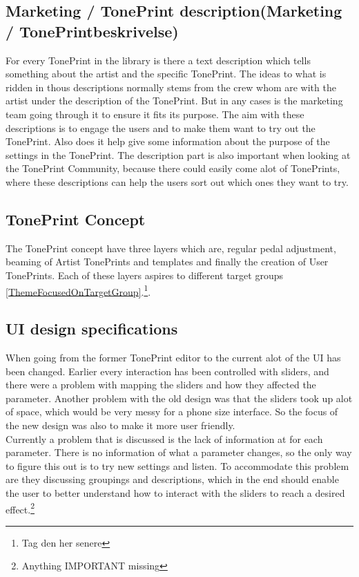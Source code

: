 \subsection*{Marketing / TonePrint description(Marketing / TonePrintbeskrivelse)} 
\label{ThemeMarketingTonePrintDescription}
For every TonePrint in the library is there a text description which tells something about the artist and the specific TonePrint. The ideas to what is ridden in thous descriptions normally stems from the crew whom are with the artist under the description of the TonePrint. But in any cases is the marketing team going through it to ensure it fits its purpose. The aim with these descriptions is to engage the users and to make them want to try out the TonePrint. Also does it help give some information about the purpose of the settings in the TonePrint. The description part is also important when looking at the TonePrint Community, because there could easily come alot of TonePrints, where these descriptions can help the users sort out which ones they want to try. 

\subsection*{TonePrint Concept}
\label{ThemeTonePrintConcept}
The TonePrint concept have three layers which are, regular pedal adjustment, beaming of Artist TonePrints and templates and finally the creation of User TonePrints. Each of these layers aspires to different target groups \autoref{ThemeFocusedOnTargetGroup}.\footnote{Tag den her senere}.

\subsection*{UI design specifications}
\label{ThemeParameterUI}
When going from the former TonePrint editor to the current alot of the UI has been changed. Earlier every interaction has been controlled with sliders, and there were a problem with mapping the sliders and how they affected the parameter. Another problem with the old design was that the sliders took up alot of space, which would be very messy for a phone size interface. So the focus of the new design was also to make it more user friendly.\\
Currently a problem that is discussed is the lack of information at for each parameter. There is no information of what a parameter changes, so the only way to figure this out is to try new settings and listen. To accommodate this problem are they discussing groupings and descriptions, which in the end should enable the user to better understand how to interact with the sliders to reach a desired effect.\footnote{Anything IMPORTANT missing}

